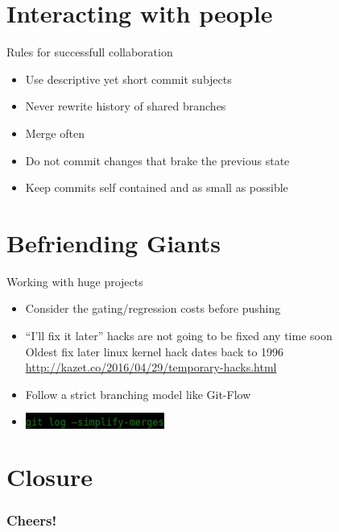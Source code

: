 \documentclass[
14pt,
aspectratio=169,
usenames,
dvipsnames,
x11names]{beamer}
\newcommand{\code}[1]{{\small\colorbox{black}{\textcolor{green}{\texttt{#1}}}}}
\begin{document}
\section{Interacting with people}

\begin{frame}{Rules for successfull collaboration}
  \begin{itemize}[<+->] \setlength{\itemsep}{\fill}
  \item Use \alert{descriptive yet short} commit subjects
  \item \alert{Never} rewrite history of shared branches
  \item \alert{Merge} often
  \item \alert{Do not} commit changes that brake the previous state
  \item Keep commits \alert{self contained} and as small as possible
  \end{itemize}
\end{frame}

\section{Befriending Giants}

\begin{frame}{Working with huge projects}
  \begin{itemize}[<+->] \setlength{\itemsep}{\fill}
  \item Consider the \alert{gating/regression costs} before pushing
  \item ``I'll fix it later'' hacks are not going to be fixed any time soon\\[1ex]
    Oldest \alert{fix later} linux kernel hack dates back to \alert{1996} \url{http://kazet.co/2016/04/29/temporary-hacks.html}
  \item Follow a strict branching model like \alert{Git-Flow}
  \item \code{git log --simplify-merges}
  \end{itemize}
\end{frame}




\section{Closure}
{
\begin{frame}[noframenumbering]
 \frametitle{\textbf{Cheers!}}
 \centering
 \titlepage
\end{frame}
}

\end{document}
